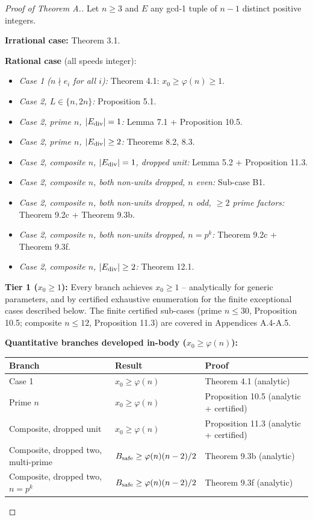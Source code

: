 \documentclass[11pt,a4paper]{article}
\theoremstyle{plain}
\theoremstyle{definition}
\theoremstyle{remark}
\begin{document}
\begin{proof}[Proof of Theorem A.]
Let $n \geq 3$ and $E$ any gcd-1 tuple of $n-1$ distinct positive integers.

\textbf{Irrational case:} Theorem 3.1.

\textbf{Rational case} (all speeds integer):

\begin{itemize}
\item \textit{Case 1 ($n \nmid e_i$ for all $i$):} Theorem 4.1: $x_0 \geq \varphi(n) \geq 1$.
\item \textit{Case 2, $L \in \{n, 2n\}$:} Proposition 5.1.
\item \textit{Case 2, prime $n$, $|E_{\rm div}|=1$:} Lemma 7.1 + Proposition 10.5.
\item \textit{Case 2, prime $n$, $|E_{\rm div}| \geq 2$:} Theorems 8.2, 8.3.
\item \textit{Case 2, composite $n$, $|E_{\rm div}|=1$, dropped unit:} Lemma 5.2 + Proposition 11.3.
\item \textit{Case 2, composite $n$, both non-units dropped, $n$ even:} Sub-case B1.
\item \textit{Case 2, composite $n$, both non-units dropped, $n$ odd, $\geq 2$ prime factors:} Theorem 9.2c + Theorem 9.3b.
\item \textit{Case 2, composite $n$, both non-units dropped, $n = p^k$:} Theorem 9.2c + Theorem 9.3f.
\item \textit{Case 2, composite $n$, $|E_{\rm div}| \geq 2$:} Theorem 12.1.
\end{itemize}

\textbf{Tier 1 ($x_0 \geq 1$):} Every branch achieves $x_0 \geq 1$ -- analytically for generic parameters, and by certified exhaustive enumeration for the finite exceptional cases described below. The finite certified sub-cases (prime $n \leq 30$, Proposition 10.5; composite $n \leq 12$, Proposition 11.3) are covered in Appendices A.4-A.5.

\textbf{Quantitative branches developed in-body ($x_0 \geq \varphi(n)$):}


\begin{center}\begin{tabular}{lll}
\toprule
Branch & Result & Proof \\
\midrule
Case 1 & $x_0 \geq \varphi(n)$ & Theorem 4.1 (analytic) \\
Prime $n$ & $x_0 \geq \varphi(n)$ & Proposition 10.5 (analytic + certified) \\
Composite, dropped unit & $x_0 \geq \varphi(n)$ & Proposition 11.3 (analytic + certified) \\
Composite, dropped two, multi-prime & $B_{\rm safe} \geq \varphi(n)(n-2)/2$ & Theorem 9.3b (analytic) \\
Composite, dropped two, $n=p^k$ & $B_{\rm safe} \geq \varphi(n)(n-2)/2$ & Theorem 9.3f (analytic) \\
\bottomrule
\end{tabular}\end{center}



\end{proof}
\end{document}
